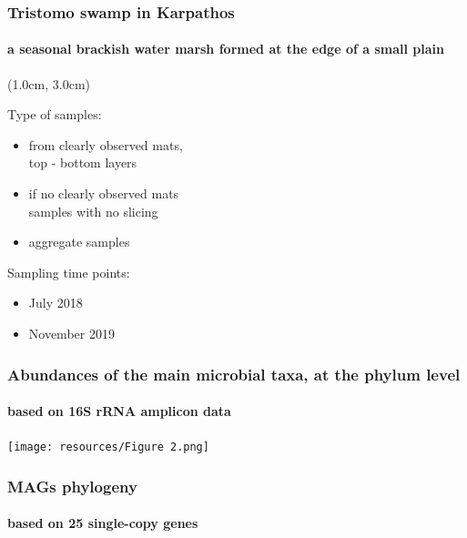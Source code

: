\documentclass{beamer}
\begin{document}
   \begin{frame}
      \frametitle{Tristomo swamp in Karpathos}
      \framesubtitle{a seasonal brackish water marsh formed at the edge of a small plain}


      \begin{textblock*}{6cm}(1.0cm, 3.0cm)
         \small 

         Type of samples: 

         \begin{itemize}
            \item from clearly observed mats, \\ top - bottom layers
            \item if no clearly observed mats \\ samples with no slicing 
            \item aggregate samples
         \end{itemize}

         \bigskip

         Sampling time points: \\
         \begin{itemize}
            \item July 2018 
            \item November 2019
         \end{itemize}


      \end{textblock*}
   \end{frame}

   \begin{frame}
      \frametitle{Abundances of the main microbial taxa, at the phylum level}
      \framesubtitle{based on 16S rRNA amplicon data}
      \centering
      \texttt{[image: resources/Figure 2.png]}
   \end{frame}

   \begin{frame}
      \frametitle{MAGs phylogeny}
      \framesubtitle{based on 25 single-copy genes }

   \end{frame}
\end{document}
